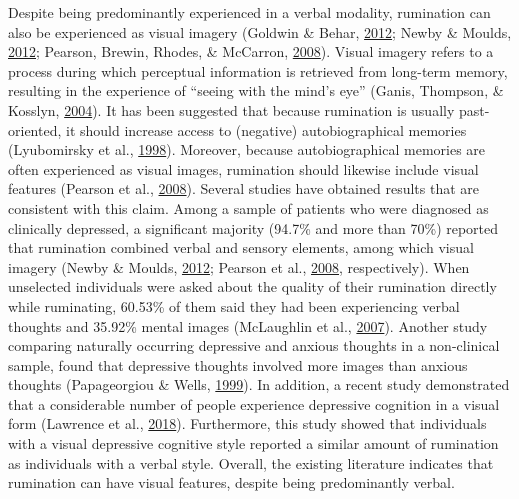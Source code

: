 \documentclass[a4paper,12pt,twoside,openright,oldfontcommands]{memoir}
\begin{document}
Despite being predominantly experienced in a verbal modality, rumination can also be experienced as visual imagery (Goldwin \& Behar, \protect\hyperlink{ref-goldwin_concreteness_2012}{2012}; Newby \& Moulds, \protect\hyperlink{ref-newby_comparison_2012}{2012}; Pearson, Brewin, Rhodes, \& McCarron, \protect\hyperlink{ref-pearson_frequency_2008}{2008}). Visual imagery refers to a process during which perceptual information is retrieved from long-term memory, resulting in the experience of \enquote{seeing with the mind's eye} (Ganis, Thompson, \& Kosslyn, \protect\hyperlink{ref-ganis_brain_2004}{2004}). It has been suggested that because rumination is usually past-oriented, it should increase access to (negative) autobiographical memories (Lyubomirsky et al., \protect\hyperlink{ref-Lyubomirsky1998}{1998}). Moreover, because autobiographical memories are often experienced as visual images, rumination should likewise include visual features (Pearson et al., \protect\hyperlink{ref-pearson_frequency_2008}{2008}). Several studies have obtained results that are consistent with this claim. Among a sample of patients who were diagnosed as clinically depressed, a significant majority (94.7\% and more than 70\%) reported that rumination combined verbal and sensory elements, among which visual imagery (Newby \& Moulds, \protect\hyperlink{ref-newby_comparison_2012}{2012}; Pearson et al., \protect\hyperlink{ref-pearson_frequency_2008}{2008}, respectively). When unselected individuals were asked about the quality of their rumination directly while ruminating, 60.53\% of them said they had been experiencing verbal thoughts and 35.92\% mental images (McLaughlin et al., \protect\hyperlink{ref-mclaughlin_effects_2007}{2007}). Another study comparing naturally occurring depressive and anxious thoughts in a non-clinical sample, found that depressive thoughts involved more images than anxious thoughts (Papageorgiou \& Wells, \protect\hyperlink{ref-papageorgiou_process_1999}{1999}). In addition, a recent study demonstrated that a considerable number of people experience depressive cognition in a visual form (Lawrence et al., \protect\hyperlink{ref-lawrence_visual_2018}{2018}). Furthermore, this study showed that individuals with a visual depressive cognitive style reported a similar amount of rumination as individuals with a verbal style. Overall, the existing literature indicates that rumination can have visual features, despite being predominantly verbal.
\end{document}
